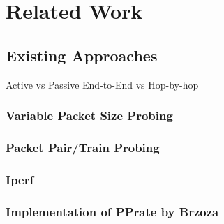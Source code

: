 \chapter{Related Work}

\section{Existing Approaches}
Active vs Passive
End-to-End vs Hop-by-hop

\subsection*{Variable Packet Size Probing}

\subsection*{Packet Pair/Train Probing}

\subsection*{Iperf}

\subsection*{Implementation of PPrate by Brzoza}
